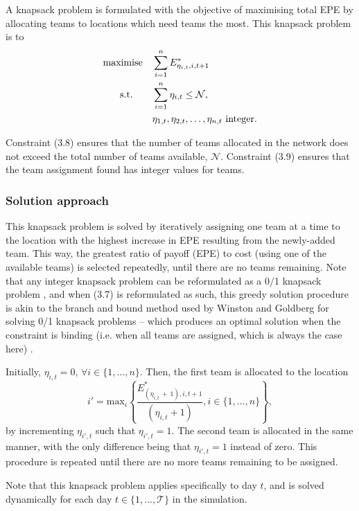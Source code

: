 A knapsack problem is formulated with the objective of maximising total EPE by allocating teams to locations which need teams the most. This knapsack problem is to
\begin{align}
\label{eqn:EPEteams}
    \text{maximise\quad} & \sum^{n}_{i=1} E^{*}_{\eta_{i,t},i,t+1} \\ 
    \text{s.t.\qquad} & \sum^{n}_{i=1} \eta_{i,t} \leq \mathcal{N}, \\
    &\eta_{1,t}, \eta_{2,t}, \ldots, \eta_{n,t} \text{ integer}.
\end{align}

Constraint (3.8) ensures that the number of teams allocated in the network does not exceed the total number of teams available, $\mathcal{N}$. Constraint (3.9) ensures that the team assignment found has integer values for teams.

\subsubsection{Solution approach}
This knapsack problem is solved by iteratively assigning one team at a time to the location with the highest increase in EPE resulting from the newly-added team. This way, the greatest ratio of payoff (EPE) to cost (using one of the available teams) is selected repeatedly, until there are no teams remaining.
Note that any integer knapsack problem can be reformulated as a 0/1 knapsack problem \cite[p.~150]{winston2004operations}, and when (3.7) is reformulated as such, this greedy solution procedure is akin to the branch and bound method used by Winston and Goldberg for solving 0/1 knapsack problems -- which produces an optimal solution when the constraint is binding (i.e. when all teams are assigned, which is always the case here) \cite{avis_2002}. 

Initially, $\eta_{i,t} = 0, \, \forall{i} \in \{1,\dots,n \}$.
Then, the first team is allocated to the location $$i' = \text{max}_{i} \left\{ \frac{E^{*}_{(\eta_{i,t}\,+\,1),i,t+1}}{(\eta_{i,t} + 1)}, i \in \{1, \dots, n\} \right\},$$ 
by incrementing $\eta_{i',t}$ such that $\eta_{i',t} = 1$. The second team is allocated in the same manner, with the only difference being that $\eta_{i',t} = 1$ instead of zero. This procedure is repeated until there are no more teams remaining to be assigned.

Note that this knapsack problem applies specifically to day $t$, and is solved dynamically for each day $t \in \{1, \dots, \mathcal{T} \}$ in the simulation.


